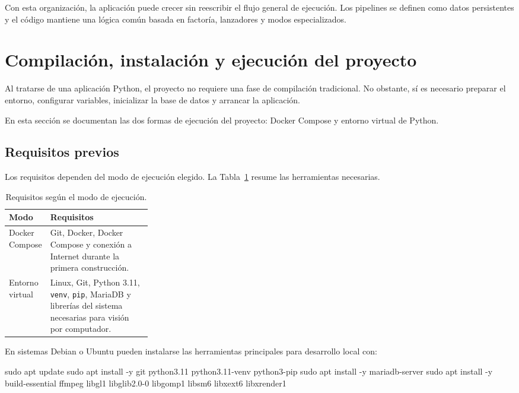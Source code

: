 Con esta organización, la aplicación puede crecer sin reescribir el flujo general de ejecución. Los pipelines se definen como datos persistentes y el código mantiene una lógica común basada en factoría, lanzadores y modos especializados.

\section{Compilación, instalación y ejecución del proyecto}

Al tratarse de una aplicación Python, el proyecto no requiere una fase de compilación tradicional. No obstante, sí es necesario preparar el entorno, configurar variables, inicializar la base de datos y arrancar la aplicación.

En esta sección se documentan las dos formas de ejecución del proyecto: Docker Compose y entorno virtual de Python.

\subsection{Requisitos previos}

Los requisitos dependen del modo de ejecución elegido. La Tabla~\ref{tabla:requisitos_ejecucion_programador} resume las herramientas necesarias.

\begin{table}[H]
	\centering
	\small
	\renewcommand{\arraystretch}{1.15}
	\begin{tabularx}{\linewidth}{p{0.28\linewidth}X}
		\toprule
		\textbf{Modo} & \textbf{Requisitos} \\
		\midrule
		Docker Compose & Git, Docker, Docker Compose y conexión a Internet durante la primera construcción. \\
		Entorno virtual & Linux, Git, Python 3.11, \texttt{venv}, \texttt{pip}, MariaDB y librerías del sistema necesarias para visión por computador. \\
		\bottomrule
	\end{tabularx}
	\caption[Requisitos de ejecución]{Requisitos según el modo de ejecución.}
	\label{tabla:requisitos_ejecucion_programador}
\end{table}

En sistemas Debian o Ubuntu pueden instalarse las herramientas principales para desarrollo local con:

\begin{bloqueTerminal}[title={Instalación de herramientas en Debian/Ubuntu}]
	sudo apt update
	sudo apt install -y git python3.11 python3.11-venv python3-pip
	sudo apt install -y mariadb-server
	sudo apt install -y build-essential ffmpeg libgl1 libglib2.0-0 libgomp1 libsm6 libxext6 libxrender1
\end{bloqueTerminal}

